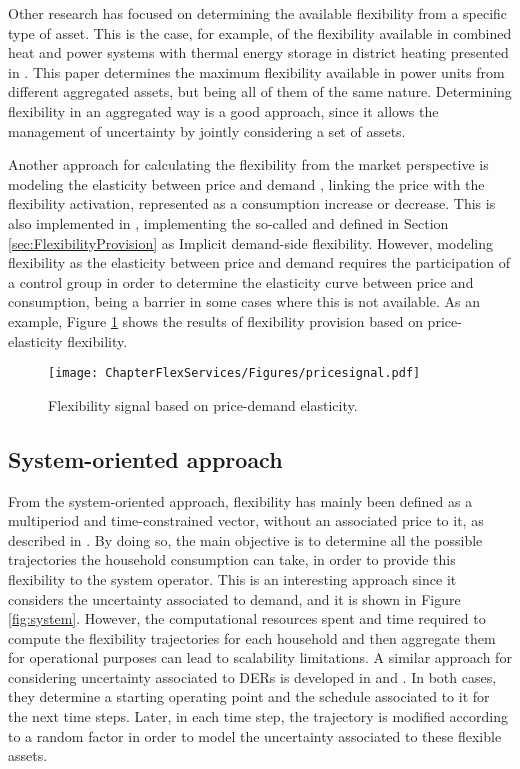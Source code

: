 
Other research has focused on determining the available flexibility from a specific type of asset. This is the case, for example, of the flexibility available in combined heat and power systems with thermal energy storage in district heating presented in \cite{nuytten2013flexibility}. This paper determines the maximum flexibility available in power units from different aggregated assets, but being all of them of the same nature. Determining flexibility in an aggregated way is a good approach, since it allows the management of uncertainty by jointly considering a set of assets.  

Another approach for calculating the flexibility from the market perspective is modeling the elasticity between price and demand \cite{Gorria2013}, linking the price with the flexibility activation, represented as a consumption increase or decrease. This is also implemented in \cite{Moret2016}, implementing the so-called and defined in Section \ref{sec:FlexibilityProvision} as Implicit demand-side flexibility. However, modeling flexibility as the elasticity between price and demand requires the participation of a control group in order to determine the elasticity curve between price and consumption, being a barrier in some cases where this is not available. As an example, Figure \ref{fig:elasticity} shows the results of flexibility provision based on price-elasticity flexibility. 

\begin{figure}[htbp]
	\centering
	\texttt{[image: ChapterFlexServices/Figures/pricesignal.pdf]}
		\caption{Flexibility signal based on price-demand elasticity.}
	\label{fig:elasticity}  
\end{figure}


\subsection{System-oriented approach}
From the system-oriented approach, flexibility has mainly been defined as a multiperiod and time-constrained vector, without an associated price to it, as described in \cite{Pinto2017}. By doing so, the main objective is to determine all the possible trajectories the household consumption can take, in order to provide this flexibility to the system operator. This is an interesting approach since it considers the uncertainty associated to demand, and it is shown in Figure \ref{fig:system}. However, the computational resources spent and time required to compute the flexibility trajectories for each household and then aggregate them for operational purposes can lead to scalability limitations. A similar approach for considering uncertainty associated to DERs is developed in \cite{Bremer2013} and \cite{SONNENSCHEIN2015}. In both cases, they determine a starting operating point and the schedule associated to it for the next time steps. Later, in each time step, the trajectory is modified according to a random factor in order to model the uncertainty associated to these flexible assets. 

